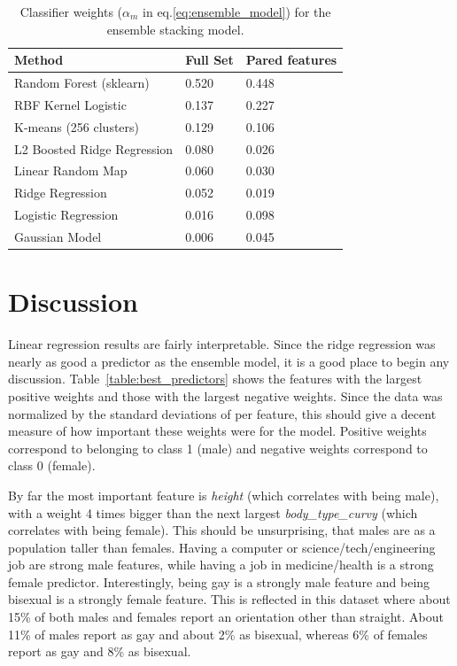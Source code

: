 \documentclass{article} %
\begin{document}
\begin{table}[]
	\centering
	\caption{Classifier weights ($\alpha_m$ in eq.\ref{eq:ensemble_model}) for the ensemble stacking model.}
	\label{table:classifier_weights}
	\begin{tabular}{lll}
		\hline
		\textbf{Method}             & \textbf{Full Set} & \textbf{Pared features} \\ \hline
		Random Forest (sklearn)     & 0.520                 & 0.448                   \\
		RBF Kernel Logistic         & 0.137                 & 0.227                   \\
		K-means (256 clusters)      & 0.129                 & 0.106                   \\
		L2 Boosted Ridge Regression & 0.080                 & 0.026                   \\
		Linear Random Map           & 0.060                 & 0.030                   \\
		Ridge Regression            & 0.052                 & 0.019                   \\
		Logistic Regression         & 0.016                 & 0.098                   \\
		Gaussian Model              & 0.006                 & 0.045                   \\ \hline
	\end{tabular}
\end{table}

\section{Discussion}
\label{sec:discussion}

Linear regression results are fairly interpretable.  Since the ridge regression was nearly as good a predictor as the ensemble model, it is a good place to begin any discussion.  Table~\ref{table:best_predictors} shows the features with the largest positive weights and those with the largest negative weights.  Since the data was normalized by the standard deviations of per feature, this should give a decent measure of how important these weights were for the model.  Positive weights correspond to belonging to class 1 (male) and negative weights correspond to class 0 (female).

By far the most important feature is \textit{height} (which correlates with being male), with a weight 4 times bigger than the next largest \textit{body\_type\_curvy} (which correlates with being female).  This should be unsurprising, that males are as a population taller than females.  Having a computer or science/tech/engineering job are strong male features, while having a job in medicine/health is a strong female predictor.  Interestingly, being gay is a strongly  male feature and being bisexual is a strongly female feature.  This is reflected in this dataset where about 15\% of both males and females report an orientation other than straight.  About 11\% of males report as gay and about 2\% as bisexual, whereas 6\% of females report as gay and 8\% as bisexual.
\end{document}
